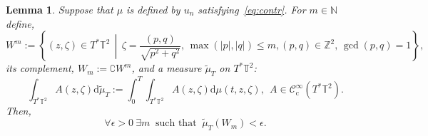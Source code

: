 \documentclass[10pt]{amsart}
\newtheorem{lemm}[theo]{Lemma}\newtheorem{prop}[theo]{Proposition}\newtheorem{coro}[theo]{Corollary}\newtheorem{conj}[theo]{Conjecture}
\theoremstyle{definition}\newtheorem{defi}[theo]{Definition}\newtheorem{rema}[theo]{Remark}\newtheorem{exam}[theo]{Example}\newtheorem{exem}[theo]{Example}\newtheorem{nota}[theo]{Notation}
\newcommand{\CIc}{{\mathcal C}^\infty_{\mathrm{c}} }
\newcommand{\NN}{{\mathbb N}}
\newcommand{\TT}{{\mathbb T}}
\newcommand*\Z{\mathbb Z}
\newcommand*{\dd}{\mathrm{d}}
\newcommand*{\dmu}{\dd \mu}
\newcommand*{\dwmu}{\dd \widetilde\mu}
\let\oldexists\exists
\renewcommand*{\exists}{\mathrel{\oldexists}}
\let\oldforall\forall
\renewcommand*{\forall}{\mathrel{\oldforall}}
\newcommand*{\Tq}{\,\middle|\,}
\begin{document}
\begin{lemm}\label{l:2}
Suppose that $\mu $ is defined by $ u_n$ satisfying~\eqref{eq:contr}. For $ m \in \NN $ define,
\[
W^m \!:=\! \left\{ (z, \zeta) \in T^* \TT^2 \Tq \zeta = \frac{ (p, q) }{
\sqrt{ p^2 + q^2 }}, \, \max(|p|, |q|) \leq m, (p, q) \in \Z^2, \, \gcd(p,q) = 1 \right\}\!,
\]
its complement, $ W_m := \complement W^m $, and a measure $ \widetilde \mu_T $ on $ T^* \TT^2 $:
\begin{equation}\label{eq:defwm}
\int_{T^* \TT^2} A (z, \zeta) \dwmu_T := \int_0^T \int_{T^* \TT^2 } A (z, \zeta) \dmu (t, z, \zeta), \ \ A \in \CIc (T^* \TT^2).
\end{equation}
Then,
\begin{equation}\label{eq:l2}
\forall \epsilon > 0 \ \exists m \ \text{ such that } \
\widetilde \mu_T (W_m) < \epsilon.
\end{equation}
\end{lemm}
\end{document}
